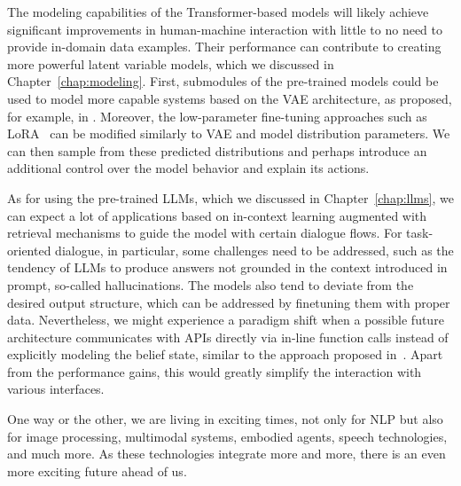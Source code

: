 The modeling capabilities of the Transformer-based models will likely achieve significant improvements in human-machine interaction with little to no need to provide in-domain data examples.
Their performance can contribute to creating more powerful latent variable models, which we discussed in Chapter~\ref{chap:modeling}.
First, submodules of the pre-trained models could be used to model more capable systems based on the VAE architecture, as proposed, for example, in \citet{li-etal-2020-optimus}.
Moreover, the low-parameter fine-tuning approaches such as LoRA~\citep{hu2021lora} can be modified similarly to VAE and model distribution parameters.
We can then sample from these predicted distributions and perhaps introduce an additional control over the model behavior and explain its actions.

As for using the pre-trained LLMs, which we discussed in Chapter~\ref{chap:llms},
we can expect a lot of applications based on in-context learning augmented with retrieval mechanisms to guide the model with certain dialogue flows.
For task-oriented dialogue, in particular, some challenges need to be addressed, such as the tendency of LLMs to produce answers not grounded in the context introduced in prompt, so-called hallucinations.
The models also tend to deviate from the desired output structure, which can be addressed by finetuning them with proper data.
Nevertheless, we might experience a paradigm shift when a possible future architecture communicates with APIs directly via in-line function calls instead of explicitly modeling the belief state, similar to the approach proposed in~\citet{schick2023toolformer}.
Apart from the performance gains, this would greatly simplify the interaction with various interfaces.

One way or the other, we are living in exciting times, not only for NLP but also for image processing, multimodal systems, embodied agents, speech technologies, and much more.
As these technologies integrate more and more, there is an even more exciting future ahead of us.
